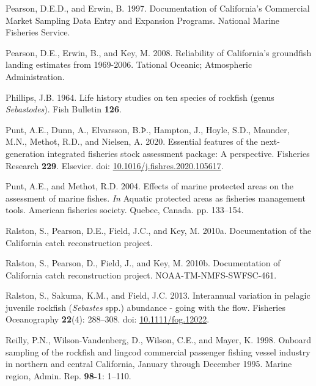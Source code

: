 \documentclass[
  english,
  a4paper,
]{article}
\newlength{\cslhangindent}
\newlength{\cslentryspacingunit} %
\newenvironment{CSLReferences}[2] %
 {%
  \setlength{\parindent}{0pt}
  \ifodd #1
  \let\oldpar\par
  \def\par{\hangindent=\cslhangindent\oldpar}
  \fi
  \setlength{\parskip}{#2\cslentryspacingunit}
 }%
 {}
\begin{document}
\begin{CSLReferences}{1}{0}
\leavevmode{}%
Pearson, D.E.D., and Erwin, B. 1997. {Documentation of California's Commercial Market Sampling Data Entry and Expansion Programs}. National Marine Fisheries Service.

\leavevmode{}%
Pearson, D.E., Erwin, B., and Key, M. 2008. {Reliability of California's groundfish landing estimates from 1969-2006}. Tational Oceanic; Atmospheric Administration.

\leavevmode{}%
Phillips, J.B. 1964. {Life history studies on ten species of rockfish (genus \emph{Sebastodes})}. Fish Bulletin \textbf{126}.

\leavevmode{}%
Punt, A.E., Dunn, A., Elvarsson, B.Þ., Hampton, J., Hoyle, S.D., Maunder, M.N., Methot, R.D., and Nielsen, A. 2020. {Essential features of the next-generation integrated fisheries stock assessment package: A perspective}. Fisheries Research \textbf{229}. Elsevier. doi: \href{https://doi.org/10.1016/j.fishres.2020.105617}{10.1016/j.fishres.2020.105617}.

\leavevmode{}%
Punt, A.E., and Methot, R.D. 2004. {Effects of marine protected areas on the assessment of marine fishes}. \emph{In} Aquatic protected areas as fisheries management tools. American fisheries society. Quebec, Canada. pp. 133--154.

\leavevmode{}%
Ralston, S., Pearson, D.E., Field, J.C., and Key, M. 2010a. {Documentation of the California catch reconstruction project}.

\leavevmode{}%
Ralston, S., Pearson, D., Field, J., and Key, M. 2010b. {Documentation of California catch reconstruction project.} NOAA-TM-NMFS-SWFSC-461.

\leavevmode{}%
Ralston, S., Sakuma, K.M., and Field, J.C. 2013. {Interannual variation in pelagic juvenile rockfish (\emph{Sebastes} spp.) abundance - going with the flow}. Fisheries Oceanography \textbf{22}(4): 288--308. doi: \href{https://doi.org/10.1111/fog.12022}{10.1111/fog.12022}.

\leavevmode{}%
Reilly, P.N., Wilson-Vandenberg, D., Wilson, C.E., and Mayer, K. 1998. {Onboard sampling of the rockfish and lingcod commercial passenger fishing vessel industry in northern and central California, January through December 1995.} Marine region, Admin. Rep. \textbf{98-1}: 1--110.


\end{CSLReferences}
\end{document}
